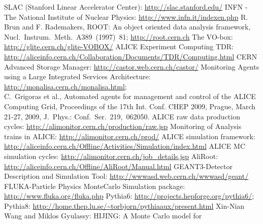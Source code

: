 \documentclass{intech}
\begin{document}
\begin{thebibliography}{100}
%
 SLAC (Stanford Linear Accelerator Center):
\url{http://slac.stanford.edu/}
%
 INFN - The National Institute of Nuclear Physics:
\newline\url{http://www.infn.it/indexen.php}
%
 R. Brun and F. Rademakers, ROOT: An object oriented data analysis framework,\\
Nucl.~Instrum.~Meth.~A389~(1997)~81; \url{http://root.cern.ch}
%
 The VO-box: \url{http://glite.cern.ch/glite-VOBOX/}
%
%
 ALICE Experiment Computing TDR:
\newline\url{http://aliceinfo.cern.ch/Collaboration/Documents/TDR/Computing.html}
%
 CERN Advanced Storage Manager:
\newline\url{http://castor.web.cern.ch/castor/}
%
 Monitoring Agents using a Large Integrated Services
Architecture:
\newline\url{http://monalisa.cern.ch/monalisa.html};\\
         C.~Grigoras et al., Automated agents for management and control of the ALICE Computing Grid,
         Proceedings of the 17th Int. Conf. CHEP 2009,
         Prague, March 21-27, 2009, J.~Phys.: Conf.~Ser.~219,~062050.
%
 ALICE raw data production cycles:
\newline\url{http://alimonitor.cern.ch/production/raw.jsp}
%
 Monitoring of Analysis trains in ALICE:
\newline\url{http://alimonitor.cern.ch/prod/}
%
 ALICE simulation framework:
\newline\url{http://aliceinfo.cern.ch/Offline/Activities/Simulation/index.html}
%
 ALICE MC simulation cycles:
\newline\url{http://alimonitor.cern.ch/job_details.jsp}
%
 AliRoot: \url{http://aliceinfo.cern.ch/Offline/AliRoot/Manual.html}
%
 GEANT3-Detector Description and Simulation Tool:
\newline\url{http://wwwasd.web.cern.ch/wwwasd/geant/}
%
 FLUKA-Particle Physics MonteCarlo Simulation package:
\newline\url{http://www.fluka.org/fluka.php}
%
 Pythia6: \url{http://projects.hepforge.org/pythia6/};\\
Pythia8: \url{http://home.thep.lu.se/~torbjorn/pythiaaux/present.html}
%
 Xin-Nian Wang and Miklos Gyulassy: HIJING: A Monte Carlo model for

\end{thebibliography}
\end{document}
